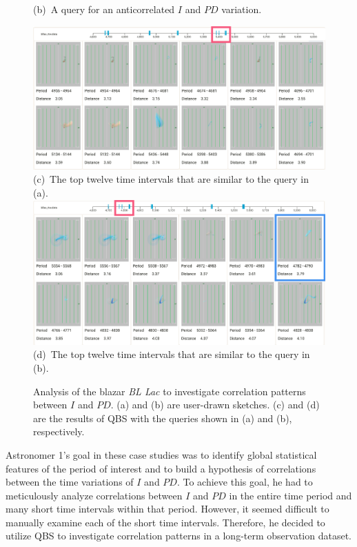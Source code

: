 \begin{figure}[tb]
\begin{minipage}{0.49\linewidth}
        \footnotesize{\sf(b)~A query for an anticorrelated $I$ and $PD$ variation.}\\
    \end{minipage}
    \includegraphics[width=.99\linewidth]{figures/correlateResultsLabel14.png}\\
    \footnotesize{\sf(c)~The top twelve time intervals that are similar to the query in (a).}\\
    \includegraphics[width=.99\linewidth]{figures/anticorrelateResultsLabel14.png}\\
    \footnotesize{\sf(d)~The top twelve time intervals that are similar to the query in (b).}
    \caption{Analysis of the blazar \emph{BL Lac} to investigate correlation patterns between $I$ and $PD$. (a) and (b) are user-drawn sketches. (c) and (d) are the results of QBS with the queries shown in (a) and (b), respectively.}
    \label{fig:EvaluationQueryResults}
\end{figure}
%
Astronomer 1's goal in these case studies was to identify global statistical features of the period of interest and to build a hypothesis of correlations between the time variations of $I$ and $PD$.
To achieve this goal, he had to meticulously analyze correlations between $I$ and $PD$ in the entire time period and many short time intervals within that period.
However, it seemed difficult to manually examine each of the short time intervals.
Therefore, he decided to utilize QBS to investigate correlation patterns in a long-term observation dataset.

